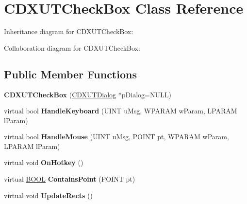 \hypertarget{class_c_d_x_u_t_check_box}{\section{C\+D\+X\+U\+T\+Check\+Box Class Reference}
\label{class_c_d_x_u_t_check_box}
}


Inheritance diagram for C\+D\+X\+U\+T\+Check\+Box\+:


Collaboration diagram for C\+D\+X\+U\+T\+Check\+Box\+:
\subsection*{Public Member Functions}
\begin{DoxyCompactItemize}
\item 
\hypertarget{class_c_d_x_u_t_check_box_a68cb9ebbafe610be02ad6b8ca72ca5d7}{{\bfseries C\+D\+X\+U\+T\+Check\+Box} (\hyperlink{class_c_d_x_u_t_dialog}{C\+D\+X\+U\+T\+Dialog} $\ast$p\+Dialog=N\+U\+L\+L)}\label{class_c_d_x_u_t_check_box_a68cb9ebbafe610be02ad6b8ca72ca5d7}

\item 
\hypertarget{class_c_d_x_u_t_check_box_a6e37b9b6be8e2c13df2927c1cf3d63ef}{virtual bool {\bfseries Handle\+Keyboard} (U\+I\+N\+T u\+Msg, W\+P\+A\+R\+A\+M w\+Param, L\+P\+A\+R\+A\+M l\+Param)}\label{class_c_d_x_u_t_check_box_a6e37b9b6be8e2c13df2927c1cf3d63ef}

\item 
\hypertarget{class_c_d_x_u_t_check_box_a4638ad4bb74d1a5fae3ba2b8b01072d6}{virtual bool {\bfseries Handle\+Mouse} (U\+I\+N\+T u\+Msg, P\+O\+I\+N\+T pt, W\+P\+A\+R\+A\+M w\+Param, L\+P\+A\+R\+A\+M l\+Param)}\label{class_c_d_x_u_t_check_box_a4638ad4bb74d1a5fae3ba2b8b01072d6}

\item 
\hypertarget{class_c_d_x_u_t_check_box_a5d9a74ce30be05f4867945c80f298a0a}{virtual void {\bfseries On\+Hotkey} ()}\label{class_c_d_x_u_t_check_box_a5d9a74ce30be05f4867945c80f298a0a}

\item 
\hypertarget{class_c_d_x_u_t_check_box_af0a106a73957da96d23dd53c2b9da8e8}{virtual \hyperlink{_ice_types_8h_a050c65e107f0c828f856a231f4b4e788}{B\+O\+O\+L} {\bfseries Contains\+Point} (P\+O\+I\+N\+T pt)}\label{class_c_d_x_u_t_check_box_af0a106a73957da96d23dd53c2b9da8e8}

\item 
\hypertarget{class_c_d_x_u_t_check_box_a3b60479864ee9a21c14f92ff5373fc14}{virtual void {\bfseries Update\+Rects} ()}\label{class_c_d_x_u_t_check_box_a3b60479864ee9a21c14f92ff5373fc14}


\end{DoxyCompactItemize}
